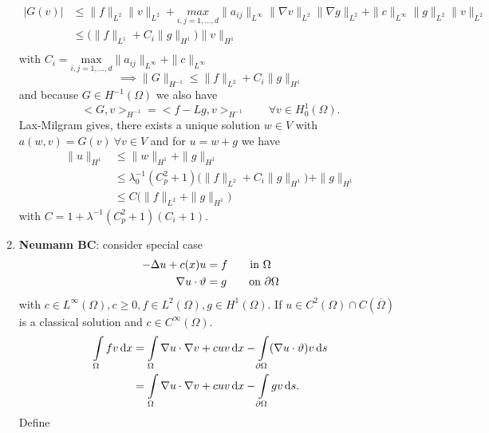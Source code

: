 \begin{enumerate}[=(\alph*)]
\begin{proof_}
\begin{itemize}
\begin{align*}
				|G(v)| & \leq \|f\|_{L^2}\|v\|_{L^2} + \underset{i,j=1, \dots, d}{max} \|a_{ij}\|_{L^\infty} \|\nabla v\|_{L^2} \|\nabla g\|_{L^2} + \|c\|_{L^\infty}\|g\|_{L^2}\|v\|_{L^2}\\
					   & \leq \big (  \|f\|_{L^1} + C_i\|g\|_{H^1} \big ) \|v\|_{H^1}\\ 
			\end{align*}
			with $C_i =  \underset{i,j=1, \dots, d}{\text{max}} \|a_{ij}\|_{L^\infty} + \|c\|_{L^\infty}$
			\begin{equation*}
				\implies  \|G\|_{H^{-1}} \leq \|f\|_{L^2} +  C_i\|g\|_{H^1}
			\end{equation*}
			and because $G \in H^{-1}(\Omega)$ we also have
			\begin{equation*}
				<G,v>_{H^{-1}} = <f-Lg,v>_{H^{-1}} \qquad \forall v \in H^1_0(\Omega).
			\end{equation*}
			Lax-Milgram gives, there exists a unique solution $w \in V$ with $a(w,v) = G(v)\ \forall v \in V$ and for $u = w+g$ we have
			\begin{align*}
				\|u\|_{H^1} & \leq \|w\|_{H^1} + \|g\|_{H^1}\\
							& \leq \lambda^{-1}_0 \left( C^2_p +1 \right)\big (  \|f\|_{L^2} +  C_i\|g\|_{H^1} \big ) + \|g\|_{H^1}\\
							& \leq C \big ( \|f\|_{L^2} + \|g\|_{H^1} \big ) 
			\end{align*}
			with $C = 1+ \lambda^{-1}(C^2_p+1)(C_i +1)$.
		\end{itemize}
	\end{proof_}
	\item \textbf{Neumann BC}:\enter
	consider special case  
	\begin{align*}
		- \Delta u + c(x)u &= f \qquad \text{in }\Omega\\
		\nabla u \cdot \vartheta &=g \qquad \text{on } \partial\Omega
	\end{align*}
	with $c \in L^\infty(\Omega), c\geq 0, f\in L^2(\Omega), g \in H^1(\Omega)$.
	If $u \in C^2(\Omega)\cap C(\overline{\Omega})$ is a classical solution and $c \in C^\infty(\Omega)$.
	\begin{align*}
		\int \limits_\Omega fv \mathop{}\!\mathrm{d} x &= \int \limits_\Omega \nabla u \cdot  \nabla v + cuv \mathop{}\!\mathrm{d} x - \int \limits_{\partial\Omega} (\nabla u \cdot \vartheta)v \mathop{}\!\mathrm{d} s\\
		&= \int \limits_\Omega \nabla u \cdot  \nabla v + cuv \mathop{}\!\mathrm{d} x - \int \limits_{\partial\Omega} gv \mathop{}\!\mathrm{d} s.
	\end{align*}
	Define 
	\begin{align*}

\end{align*}
\end{enumerate}
